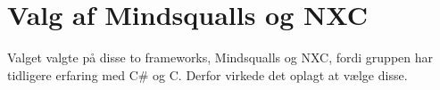 \section{Valg af Mindsqualls og NXC}
Valget valgte på disse to frameworks, Mindsqualls og NXC, fordi gruppen har tidligere erfaring med C\# og C.
Derfor virkede det oplagt at vælge disse.